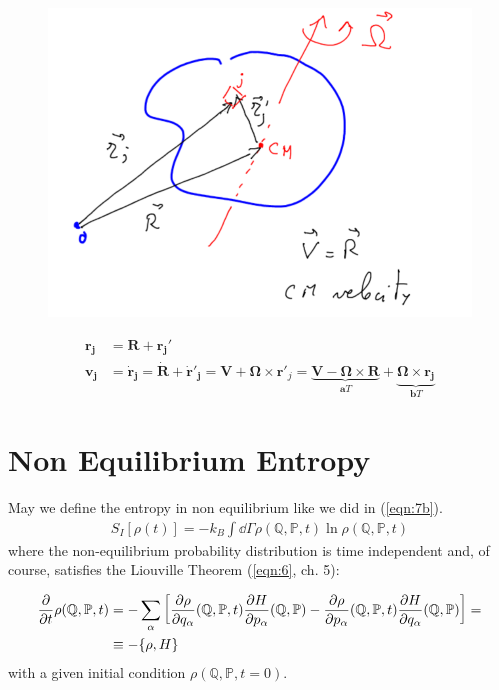 \documentclass[../template.tex]{subfiles}
\begin{document}
\begin{figure}[H]
    \centering
    \includegraphics{image006.png}
    \caption{\label{fig:rotations}}
\end{figure}

\begin{align*}
    \bm{r_j} &= \bm{R} + \bm{r_j'}\\
    \bm{v_j} &= \dot{\bm{r}}_{\bm{j}} = \dot{\bm{R}} + \dot{\bm{r}}'_{\bm{j}} = \bm{V} + \bm{\Omega} \times \bm{r}'_j = \underbrace{\bm{V} - \bm{\Omega} \times \bm{R}}_{\bm{a}T} + \underbrace{\bm{\Omega} \times \bm{r_j}}_{\bm{b}T}
\end{align*}

\section{Non Equilibrium Entropy}
May we define the entropy in non equilibrium like we did in (\ref{eqn:7b}).
\begin{align}\label{eqn:82}
    S_I[\rho(t)] = -k_B \int \dd{\Gamma} \rho(\mathbb{Q}, \mathbb{P}, t) \ln \rho(\mathbb{Q}, \mathbb{P},t)
\end{align}
where the non-equilibrium probability distribution is time independent and, of course, satisfies the Liouville Theorem (\ref{eqn:6}, ch. 5):

\begin{align}\label{eqn:83}
    \pdv{t} \rho(\mathbb{Q}, \mathbb{P}, t) &= - \sum_\alpha \left[{\pdv{\rho}{q_\alpha}}(\mathbb{Q}, \mathbb{P},t) {\pdv{H}{p_\alpha}}(\mathbb{Q}, \mathbb{P}) - {\pdv{\rho}{p_\alpha}}(\mathbb{Q}, \mathbb{P}, t) {\pdv{H}{q_\alpha}}(\mathbb{Q}, \mathbb{P}) \right] =\\
    &\equiv -\{\rho, H\} \nonumber
\end{align}
with a given initial condition $\rho(\mathbb{Q}, \mathbb{P}, t=0)$.
\end{document}
